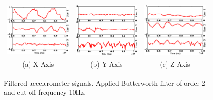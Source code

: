 \begin{figure}
\begin{center}
\begin{tabular}{ccc}
\includegraphics [width=.33\linewidth]{figure/filtered_x.eps}&
\includegraphics [width=.33\linewidth]{figure/filtered_y.eps}&
\includegraphics [width=.33\linewidth]{figure/filtered_z.eps}\\
(a) X-Axis & (b) Y-Axis & (c) Z-Axis \\
\end{tabular}

\end{center}
\caption{Filtered accelerometer signals. Applied Butterworth
filter of order 2 and cut-off frequency 10Hz.
\label{fig:filteredacc}}
\end{figure}


